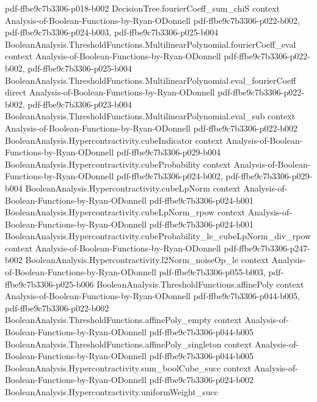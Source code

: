 \begin{theorem}
  {pdf-ffbe9c7b3306-p018-b002}
\proofstep
  {DecisionTree.fourierCoeff_sum_chiS}
  {context}
  {Analysis-of-Boolean-Functions-by-Ryan-ODonnell}
  {pdf-ffbe9c7b3306-p022-b002,
    pdf-ffbe9c7b3306-p024-b003,
    pdf-ffbe9c7b3306-p025-b004}
\proofstep
  {BooleanAnalysis.ThresholdFunctions.MultilinearPolynomial.fourierCoeff_eval}
  {context}
  {Analysis-of-Boolean-Functions-by-Ryan-ODonnell}
  {pdf-ffbe9c7b3306-p022-b002,
    pdf-ffbe9c7b3306-p025-b004}
\proofstep
  {BooleanAnalysis.ThresholdFunctions.MultilinearPolynomial.eval_fourierCoeff}
  {direct}
  {Analysis-of-Boolean-Functions-by-Ryan-ODonnell}
  {pdf-ffbe9c7b3306-p022-b002,
    pdf-ffbe9c7b3306-p023-b004}
\proofstep
  {BooleanAnalysis.ThresholdFunctions.MultilinearPolynomial.eval_sub}
  {context}
  {Analysis-of-Boolean-Functions-by-Ryan-ODonnell}
  {pdf-ffbe9c7b3306-p022-b002}
\proofstep
  {BooleanAnalysis.Hypercontractivity.cubeIndicator}
  {context}
  {Analysis-of-Boolean-Functions-by-Ryan-ODonnell}
  {pdf-ffbe9c7b3306-p029-b004}
\proofstep
  {BooleanAnalysis.Hypercontractivity.cubeProbability}
  {context}
  {Analysis-of-Boolean-Functions-by-Ryan-ODonnell}
  {pdf-ffbe9c7b3306-p024-b002,
    pdf-ffbe9c7b3306-p029-b004}
\proofstep
  {BooleanAnalysis.Hypercontractivity.cubeLpNorm}
  {context}
  {Analysis-of-Boolean-Functions-by-Ryan-ODonnell}
  {pdf-ffbe9c7b3306-p024-b001}
\proofstep
  {BooleanAnalysis.Hypercontractivity.cubeLpNorm_rpow}
  {context}
  {Analysis-of-Boolean-Functions-by-Ryan-ODonnell}
  {pdf-ffbe9c7b3306-p024-b001}
\proofstep
  {BooleanAnalysis.Hypercontractivity.cubeProbability_le_cubeLpNorm_div_rpow}
  {context}
  {Analysis-of-Boolean-Functions-by-Ryan-ODonnell}
  {pdf-ffbe9c7b3306-p247-b002}
\proofstep
  {BooleanAnalysis.Hypercontractivity.l2Norm_noiseOp_le}
  {context}
  {Analysis-of-Boolean-Functions-by-Ryan-ODonnell}
  {pdf-ffbe9c7b3306-p055-b003,
    pdf-ffbe9c7b3306-p025-b006}
\proofstep
  {BooleanAnalysis.ThresholdFunctions.affinePoly}
  {context}
  {Analysis-of-Boolean-Functions-by-Ryan-ODonnell}
  {pdf-ffbe9c7b3306-p044-b005,
    pdf-ffbe9c7b3306-p022-b002}
\proofstep
  {BooleanAnalysis.ThresholdFunctions.affinePoly_empty}
  {context}
  {Analysis-of-Boolean-Functions-by-Ryan-ODonnell}
  {pdf-ffbe9c7b3306-p044-b005}
\proofstep
  {BooleanAnalysis.ThresholdFunctions.affinePoly_singleton}
  {context}
  {Analysis-of-Boolean-Functions-by-Ryan-ODonnell}
  {pdf-ffbe9c7b3306-p044-b005}
\proofstep
  {BooleanAnalysis.Hypercontractivity.sum_boolCube_succ}
  {context}
  {Analysis-of-Boolean-Functions-by-Ryan-ODonnell}
  {pdf-ffbe9c7b3306-p024-b002}
\proofstep
  {BooleanAnalysis.Hypercontractivity.uniformWeight_succ}

\end{theorem}
